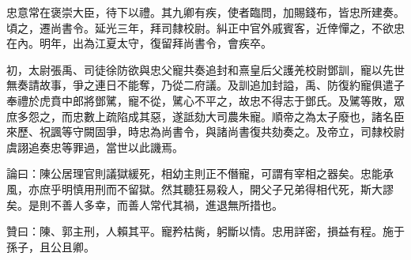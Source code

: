 \begin{pinyinscope}
忠意常在褒崇大臣，待下以禮。其九卿有疾，使者臨問，加賜錢布，皆忠所建奏。頃之，遷尚書令。延光三年，拜司隸校尉。糾正中官外戚賓客，近倖憚之，不欲忠在內。明年，出為江夏太守，復留拜尚書令，會疾卒。

初，太尉張禹、司徒徐防欲與忠父寵共奏追封和熹皇后父護羌校尉鄧訓，寵以先世無奏請故事，爭之連日不能奪，乃從二府議。及訓追加封謚，禹、防復約寵俱遣子奉禮於虎賁中郎將鄧騭，寵不從，騭心不平之，故忠不得志于鄧氏。及騭等敗，眾庶多怨之，而忠數上疏陷成其惡，遂詆劾大司農朱寵。順帝之為太子廢也，諸名臣來歷、祝諷等守闕固爭，時忠為尚書令，與諸尚書復共劾奏之。及帝立，司隸校尉虞詡追奏忠等罪過，當世以此譏焉。

論曰：陳公居理官則議獄緩死，相幼主則正不僭寵，可謂有宰相之器矣。忠能承風，亦庶乎明慎用刑而不留獄。然其聽狂易殺人，開父子兄弟得相代死，斯大謬矣。是則不善人多幸，而善人常代其禍，進退無所措也。

贊曰：陳、郭主刑，人賴其平。寵矜枯胔，躬斷以情。忠用詳密，損益有程。施于孫子，且公且卿。


\end{pinyinscope}